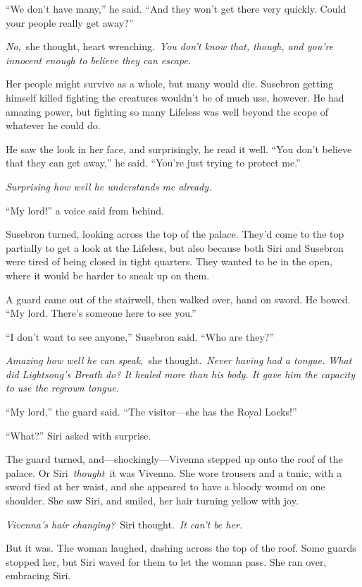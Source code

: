 “We don’t have many,” he said. “And they won’t get there very quickly. Could your people really get away?”

\textit{No,}~she thought, heart wrenching.~\textit{You don’t know that, though, and you’re innocent enough to believe they can escape.}

Her people might survive as a whole, but many would die. Susebron getting himself killed fighting the creatures wouldn’t be of much use, however. He had amazing power, but fighting so many Lifeless was well beyond the scope of whatever he could do.

He saw the look in her face, and surprisingly, he read it well. “You don’t believe that they can get away,” he said. “You’re just trying to protect me.”

\textit{Surprising how well he understands me already.}

“My lord!” a voice said from behind.

Susebron turned, looking across the top of the palace. They’d come to the top partially to get a look at the Lifeless, but also because both Siri and Susebron were tired of being closed in tight quarters. They wanted to be in the open, where it would be harder to sneak up on them.

A guard came out of the stairwell, then walked over, hand on sword. He bowed. “My lord. There’s someone here to see you.”

“I don’t want to see anyone,” Susebron said. “Who are they?”

\textit{Amazing how well he can speak,}~she thought.~\textit{Never having had a tongue. What did Lightsong’s Breath do? It healed more than his body. It gave him the capacity to use the regrown tongue.}

“My lord,” the guard said. “The visitor—she has the Royal Locks!”

“What?” Siri asked with surprise.

The guard turned, and—shockingly—Vivenna stepped up onto the roof of the palace. Or Siri~\textit{thought}~it was Vivenna. She wore trousers and a tunic, with a sword tied at her waist, and she appeared to have a bloody wound on one shoulder. She saw Siri, and smiled, her hair turning yellow with joy.

\textit{Vivenna’s hair changing?}~Siri thought.~\textit{It can’t be her.}

But it was. The woman laughed, dashing across the top of the roof. Some guards stopped her, but Siri waved for them to let the woman pass. She ran over, embracing Siri.

